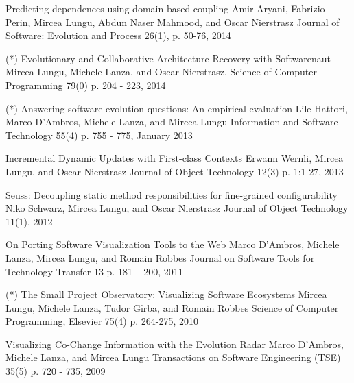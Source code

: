 
\begin{enumerate}

\paper
	{Predicting dependences using domain-based coupling}
	{Amir Aryani, Fabrizio Perin, Mircea Lungu, Abdun Naser Mahmood, and Oscar Nierstrasz}
	{Journal of Software: Evolution and Process 26(1), p. 50-76, 2014}

\paper 
	{(*) Evolutionary and Collaborative Architecture Recovery with Softwarenaut}
	{Mircea Lungu, Michele Lanza, and Oscar Nierstrasz.}
	{Science of Computer Programming 79(0) p. 204 - 223, 2014}

\paper 
	{(*) Answering software evolution questions: An empirical evaluation}
	{Lile Hattori, Marco D'Ambros, Michele Lanza, and Mircea Lungu}
	{Information and Software Technology 55(4) p. 755 - 775, January 2013}

\paper 
	{Incremental Dynamic Updates with First-class Contexts}
	{Erwann Wernli, Mircea Lungu, and Oscar Nierstrasz}
	{Journal of Object Technology 12(3) p. 1:1-27, 2013}

\paper
	{Seuss: Decoupling  static method responsibilities for fine-grained configurability}
	{Niko Schwarz, Mircea Lungu, and Oscar Nierstrasz}
	{Journal of Object Technology 11(1), 2012}

\paper 
	{On Porting Software Visualization Tools to the Web}
	{Marco D'Ambros, Michele Lanza, Mircea Lungu, and Romain Robbes}
	{Journal on Software Tools for Technology Transfer 13 p. 181 -- 200, 2011}

\paper 
	{(*) The Small Project Observatory: Visualizing Software Ecosystems}
	{Mircea Lungu, Michele Lanza, Tudor G\^irba, and Romain Robbes}
	{Science of Computer Programming, Elsevier 75(4) p. 264-275, 2010}

\paper 
	{Visualizing Co-Change Information with the Evolution Radar}
	{Marco D'Ambros, Michele Lanza, and Mircea Lungu}
	{Transactions on Software Engineering (TSE) 35(5) p. 720 - 735, 2009}

\end{enumerate}




